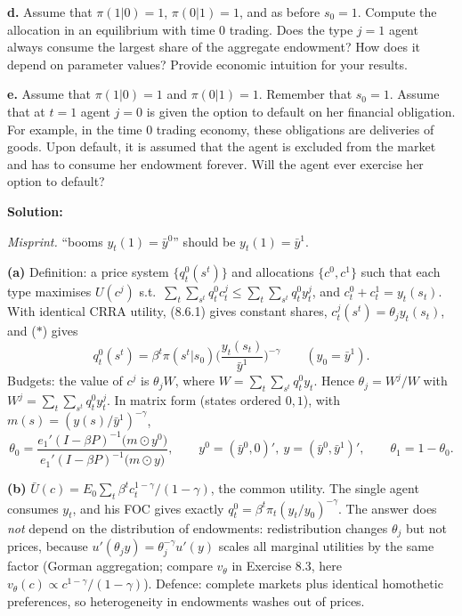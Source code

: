 \documentclass[12pt, letterpaper]{article}
\begin{document}
\begin{tcolorbox}[evenbox,title={Exercise 8.14 \quad Donated by Pierre-Olivier Weill}]
\begin{tcolorbox}[questionbox]
\textbf{d.} Assume that $\pi(1|0)=1$, $\pi(0|1)=1$, and as before $s_0=1$. Compute the allocation in an
equilibrium with time 0 trading. Does the type $j=1$ agent always consume the largest share of the
aggregate endowment? How does it depend on parameter values? Provide economic intuition for your results.

\textbf{e.} Assume that $\pi(1|0)=1$ and $\pi(0|1)=1$. Remember that $s_0=1$. Assume that at $t=1$ agent
$j=0$ is given the option to default on her financial obligation. For example, in the time 0 trading
economy, these obligations are deliveries of goods. Upon default, it is assumed that the agent is excluded
from the market and has to consume her endowment forever. Will the agent ever exercise her option to
default?
\end{tcolorbox}

\textbf{Solution:}

\emph{Misprint.} ``booms $y_t(1)=\bar y^0$'' should be $y_t(1)=\bar y^1$.

\textbf{(a)} Definition: a price system $\{q^0_t(s^t)\}$ and allocations $\{c^0,c^1\}$ such that each type maximises
$U(c^j)$ s.t.\ $\sum_t\sum_{s^t}q^0_tc^j_t\le\sum_t\sum_{s^t}q^0_ty^j_t$, and $c^0_t+c^1_t=y_t(s_t)$. With identical CRRA
utility, (8.6.1) gives constant shares, $c^j_t(s^t)=\theta_jy_t(s_t)$, and ($\ast$) gives
\[
q^0_t(s^t)=\beta^t\pi(s^t|s_0)\Big(\frac{y_t(s_t)}{\bar y^1}\Big)^{-\gamma}\qquad(y_0=\bar y^1).
\]
Budgets: the value of $c^j$ is $\theta_jW$, where $W=\sum_t\sum_{s^t}q^0_ty_t$. Hence $\theta_j=W^j/W$ with
$W^j=\sum_t\sum_{s^t}q^0_ty^j_t$. In matrix form (states ordered $0,1$), with $m(s)=(y(s)/\bar y^1)^{-\gamma}$,
\[
\theta_0=\frac{e_1'(I-\beta P)^{-1}\big(m\odot y^0\big)}{e_1'(I-\beta P)^{-1}\big(m\odot y\big)},\qquad
y^0=(\bar y^0,0)',\ y=(\bar y^0,\bar y^1)',\qquad\theta_1=1-\theta_0 .
\]

\textbf{(b)} $\bar U(c)=E_0\sum_t\beta^tc_t^{1-\gamma}/(1-\gamma)$, the common utility. The single agent consumes
$y_t$, and his FOC gives exactly $q^0_t=\beta^t\pi_t(y_t/y_0)^{-\gamma}$. The answer does \emph{not} depend on the
distribution of endowments: redistribution changes $\theta_j$ but not prices, because
$u'(\theta_jy)=\theta_j^{-\gamma}u'(y)$ scales all marginal utilities by the same factor (Gorman aggregation;
compare $v_\theta$ in Exercise 8.3, here $v_\theta(c)\propto c^{1-\gamma}/(1-\gamma)$). Defence: complete markets plus
identical homothetic preferences, so heterogeneity in endowments washes out of prices.


\end{tcolorbox}
\end{document}

